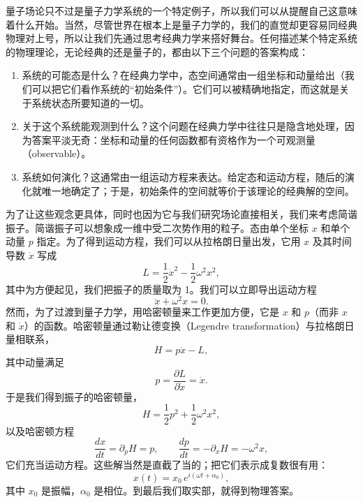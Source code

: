 量子场论只不过是量子力学系统的一个特定例子，所以我们可以从提醒自己这意味着什么开始。当然，尽管世界在根本上是量子力学的，我们的直觉却更容易同经典物理对上号，所以让我们先通过思考经典力学来搭好舞台。任何描述某个特定系统的物理理论，无论经典的还是量子的，都由以下三个问题的答案构成：

\begin{enumerate}
\item 系统的可能态是什么？在经典力学中，态空间通常由一组坐标和动量给出（我们可以把它们看作系统的“初始条件”）。它们可以被精确地指定，而这就是关于系统状态所要知道的一切。
\item 关于这个系统能观测到什么？这个问题在经典力学中往往只是隐含地处理，因为答案平淡无奇：坐标和动量的任何函数都有资格作为一个可观测量（observable）。
\item 系统如何演化？这通常由一组运动方程来表达。给定态和运动方程，随后的演化就唯一地确定了；于是，初始条件的空间就等价于该理论的经典解的空间。
\end{enumerate}

为了让这些观念更具体，同时也因为它与我们研究场论直接相关，我们来考虑简谐振子。简谐振子可以想象成一维中受二次势作用的粒子。态由单个坐标 $x$ 和单个动量 $p$ 指定。为了得到运动方程，我们可以从拉格朗日量出发，它用 $x$ 及其时间导数 $\dot{x}$ 写成
\begin{equation*}
L = \frac{1}{2}\dot{x}^2 - \frac{1}{2}\omega^2 x^2,
\tag{9.3}
\end{equation*}
其中为方便起见，我们把振子的质量取为 1。我们可以立即导出运动方程
\begin{equation*}
\ddot{x} + \omega^2 x = 0.
\tag{9.4}
\end{equation*}
然而，为了过渡到量子力学，用哈密顿量来工作更加方便，它是 $x$ 和 $p$（而非 $x$ 和 $\dot{x}$）的函数。哈密顿量通过勒让德变换（Legendre transformation）与拉格朗日量相联系，
\begin{equation*}
H = p\dot{x} - L,
\tag{9.5}
\end{equation*}
其中动量满足
\begin{equation*}
p = \frac{\partial L}{\partial \dot{x}} = \dot{x}.
\tag{9.6}
\end{equation*}
于是我们得到振子的哈密顿量，
\begin{equation*}
H = \frac{1}{2}p^2 + \frac{1}{2}\omega^2 x^2,
\tag{9.7}
\end{equation*}
以及哈密顿方程
\begin{equation*}
\frac{dx}{dt} = \partial_p H = p, \qquad \frac{dp}{dt} = -\partial_x H = -\omega^2 x,
\tag{9.8}
\end{equation*}
它们充当运动方程。这些解当然是直截了当的；把它们表示成复数很有用：
\begin{equation*}
x(t) = x_0\, e^{i(\omega t + \alpha_0)},
\tag{9.9}
\end{equation*}
其中 $x_0$ 是振幅，$\alpha_0$ 是相位。到最后我们取实部，就得到物理答案。

